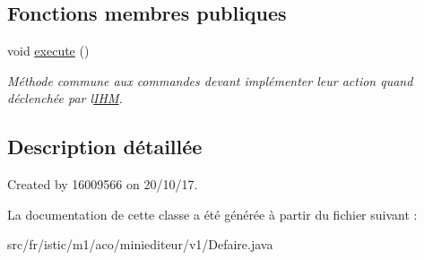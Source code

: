 \subsection*{Fonctions membres publiques}
\begin{DoxyCompactItemize}
\item 
\mbox{\label{classfr_1_1istic_1_1m1_1_1aco_1_1miniediteur_1_1v1_1_1Defaire_a3b8c0beab28336ae060284fdf4a78a52}} 
void \hyperlink{classfr_1_1istic_1_1m1_1_1aco_1_1miniediteur_1_1v1_1_1Defaire_a3b8c0beab28336ae060284fdf4a78a52}{execute} ()
\begin{DoxyCompactList}\small\item\em Méthode commune aux commandes devant implémenter leur action quand déclenchée par l\textquotesingle{}\hyperlink{interfacefr_1_1istic_1_1m1_1_1aco_1_1miniediteur_1_1v1_1_1IHM}{I\+HM}. \end{DoxyCompactList}\end{DoxyCompactItemize}


\subsection{Description détaillée}
Created by 16009566 on 20/10/17. 

La documentation de cette classe a été générée à partir du fichier suivant \+:\begin{DoxyCompactItemize}
\item 
src/fr/istic/m1/aco/miniediteur/v1/Defaire.\+java\end{DoxyCompactItemize}
